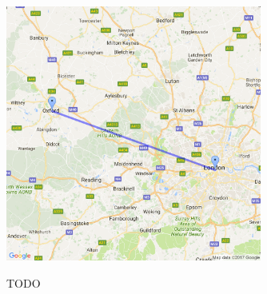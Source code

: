 \begin{figure}[!h]
\centering
\caption{TODO}
\includegraphics[width=0.75\textwidth]{modules/oxford_path_2}
 \label{fig:ruta_oxford_2}
\end{figure}
